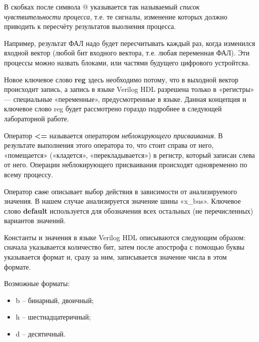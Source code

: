 \documentclass[a5paper, DIV=14, headings=openany, twoside=true,fontsize=10pt, titlepage]{scrreprt}
\newcommand{\quotes}[1]{«#1»}
\newcommand{\eng}[1]{\foreignlanguage{english}{#1}}
\newcommand{\qeng}[1]{\quotes{\eng{#1}}}
\newcommand{\kword}[1]{\eng{\textbf{#1}}}
\begin{document}
\par{В скобках после символа @ указывается так называемый \emph{список чувствительности процесса}, т.е. те сигналы, изменение которых должно приводить к пересчёту результатов выолнения процесса.}

\par{Например, результат ФАЛ надо будет пересчитывать каждый раз, когда изменился входной вектор (любой бит входного вектора, т.е. любая переменная ФАЛ). Эти процессы можно назвать блоками, или частями будущего цифрового устройтсва.}

\par{Новое ключевое слово \kword{reg} здесь необходимо потому, что в выходной вектор происходит запись, а запись в языке \eng{Verilog HDL} разрешена только в «регистры» — специальные «переменные», предусмотренные в языке. Данная концепция и ключевое слово reg будет рассмотрено гораздо подробнее в следующей лабораторной работе.}

\par{Оператор \kword{<=} называется оператором \emph{неблокирующего присваивания}. В результате выполнения этого оператора то, что стоит справа от него, «помещается» («кладется», «перекладывается») в регистр, который записан слева от него. Операции неблокирующего присваивания происходят одновременно по всему процессу.}

\par{Оператор \kword{case} описывает выбор действия в зависимости от анализируемого значения. В нашем случае анализируется значение шины \qeng{x\_bus}. Ключевое слово \kword{default} используется для обозначения всех остальных (не перечисленных) вариантов значений.}

\par{Константы и значения в языке \eng{Verilog HDL} описываются следующим образом: сначала указывается количество бит, затем после апострофа с помощью буквы указывается формат и, сразу за ним, записывается значение числа в этом формате.}

\par{Возможные форматы:
  \begin{itemize}[noitemsep,topsep=0pt, after=\vspace{2pt}]
  \item b – бинарный, двоичный;
  \item h – шестнадцатеричный;
  \item d – десятичный.
\end{itemize}}
\end{document}
